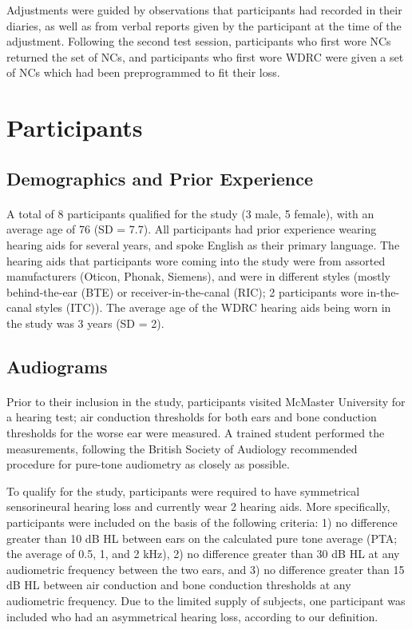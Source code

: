 Adjustments were guided by observations that participants had recorded in their diaries, as well as from verbal reports given by the participant at the time of the adjustment.  Following the second test session, participants who first wore NCs returned the set of NCs, and participants who first wore WDRC were given a set of NCs which had been preprogrammed to fit their loss.

\section{Participants}
\subsection{Demographics and Prior Experience}
\paragraph{}A total of 8 participants qualified for the study (3 male, 5 female), with an average age of 76 (SD = 7.7).  All participants had prior experience wearing hearing aids for several years, and spoke English as their primary language.  The hearing aids that participants wore coming into the study were from assorted manufacturers (Oticon, Phonak, Siemens), and were in different styles (mostly behind-the-ear (BTE) or receiver-in-the-canal (RIC); 2 participants wore in-the-canal styles (ITC)).  The average age of the WDRC hearing aids being worn in the study was 3 years (SD = 2).

\subsection{Audiograms}
\paragraph{}Prior to their inclusion in the study, participants visited McMaster University for a hearing test; air conduction thresholds for both ears and bone conduction thresholds for the worse ear were measured.  A trained student performed the measurements, following the British Society of Audiology recommended procedure for pure-tone audiometry \cite{BSA2004} as closely as possible.

To qualify for the study, participants were required to have symmetrical sensorineural hearing loss and currently wear 2 hearing aids.  More specifically, participants were included on the basis of the following criteria: 1) no difference greater than 10 dB HL between ears on the calculated pure tone average (PTA; the average of 0.5, 1, and 2 kHz), 2) no difference greater than 30 dB HL at any audiometric frequency between the two ears, and 3) no difference greater than 15 dB HL between air conduction and bone conduction thresholds at any audiometric frequency.  Due to the limited supply of subjects, one participant was included who had an asymmetrical hearing loss, according to our definition.

